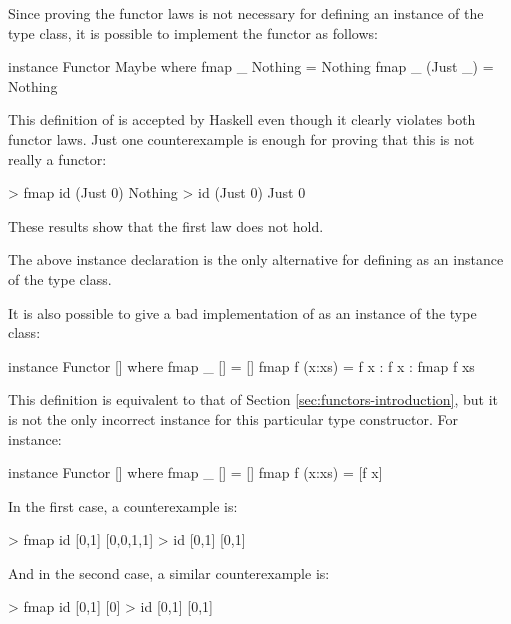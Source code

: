 \begin{example}

  \label{ex:functor-bad-maybe-haskell}

  Since proving the functor laws is not necessary for defining an
  instance of the  type class, it is possible to
  implement the  functor as follows:
  \begin{codehaskell}
instance Functor Maybe where
  fmap _ Nothing  = Nothing
  fmap _ (Just _) = Nothing
  \end{codehaskell}

  This definition of  is accepted by Haskell even though
  it clearly violates both functor laws. Just one counterexample is
  enough for proving that this is not really a functor:
  \begin{codehaskell}
> fmap id (Just 0)
Nothing
> id (Just 0)
Just 0
  \end{codehaskell}
  These results show that the first law does not hold.

  The above instance declaration is the only alternative for defining
   as an instance of the  type class.

\end{example}

\begin{example}[\texthaskell{[]}]

  It is also possible to give a bad implementation of \texthaskell{[]} as
  an instance of the  type class:
  \begin{codehaskell}
instance Functor [] where
  fmap _ []     = []
  fmap f (x:xs) = f x : f x : fmap f xs
  \end{codehaskell}
  This definition is equivalent to that of Section
  \ref{sec:functors-introduction}, but it is not the only incorrect
  instance for this particular type constructor. For instance:
  \begin{codehaskell}
instance Functor [] where
  fmap _ []     = []
  fmap f (x:xs) = [f x]
  \end{codehaskell}

  In the first case, a counterexample is:
  \begin{codehaskell}
> fmap id [0,1]
[0,0,1,1]
> id [0,1]
[0,1]
  \end{codehaskell}

  And in the second case, a similar counterexample is:
  \begin{codehaskell}
> fmap id [0,1]
[0]
> id [0,1]
[0,1]
  \end{codehaskell}

\end{example}

